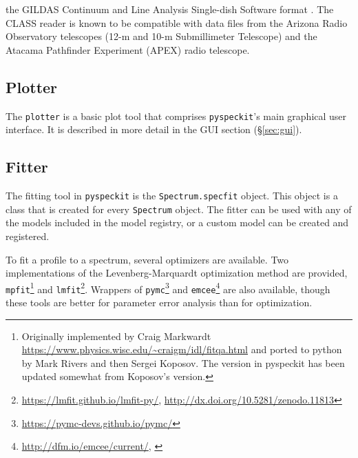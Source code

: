 \documentclass[twocolumn]{aastex62}
\newcommand{\pyspeckit}{\texttt{pyspeckit}\xspace}
\begin{document}
\begin{itemize}
        the GILDAS Continuum and Line Analysis Single-dish Software format
        \citep[CLASS;][]{Gildas-Team2013a}.  
        The CLASS reader is known to be compatible with data files from
        the Arizona Radio Observatory telescopes (12-m and 10-m Submillimeter
        Telescope) and the Atacama Pathfinder Experiment (APEX) radio
        telescope.
\end{itemize}

\subsection{Plotter}
The \texttt{plotter} is a basic plot tool that comprises \pyspeckit's main
graphical user interface.
It is described in more detail in the  GUI section (\S \ref{sec:gui}).


\subsection{Fitter}
\label{sec:fitters}
The fitting tool in \pyspeckit is the \texttt{Spectrum.specfit} object.
This object is a class that is created for every \texttt{Spectrum} object.
The fitter can be used with any of the models included in the model
registry, or a custom model can be created and registered.

To fit a profile to a spectrum, several optimizers are available.  Two
implementations of the Levenberg-Marquardt optimization method
\citep{Levenberg1944a,Marquardt1963a} are provided,
\texttt{mpfit}\footnote{Originally implemented by Craig Markwardt
\url{https://www.physics.wisc.edu/~craigm/idl/fitqa.html} and ported to python
by Mark Rivers and then Sergei Koposov.  The version in pyspeckit has been
updated somewhat from Koposov's version.} and
\texttt{lmfit}\footnote{\url{https://lmfit.github.io/lmfit-py/},
\url{http://dx.doi.org/10.5281/zenodo.11813}}.  Wrappers of
\texttt{pymc}\footnote{\url{https://pymc-devs.github.io/pymc/}} and
\texttt{emcee}\footnote{\url{http://dfm.io/emcee/current/},
\citet{Foreman-Mackey2013a}} are also available, though these tools are better
for parameter error analysis than for optimization.
\end{document}
